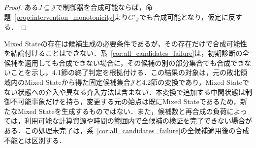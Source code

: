 \begin{proof}
ある$J\subseteq\mathcal{J}$で制御器を合成可能ならば，命題~\ref{prop:intervention_monotonicity}より$G'_{\mathcal{J}}$でも合成可能となり，仮定に反する．

\end{proof}

Mixed Stateの存在は候補生成の必要条件であるが，その存在だけで合成可能性を結論付けることはできない．系~\ref{cor:all_candidates_failure}は，初期診断の全候補を適用しても合成できない場合に，その候補の別の部分集合でも合成できないことを示し，4.1節の終了判定を根拠付ける．この結果の対象は，元の敗北領域内のMixed Stateから得た固定候補集合$\mathcal{J}$と4.2節の変換であり，Mixed Stateでない状態への介入や異なる介入方法は含まない．本変換で追加する中間状態は制御不可能事象だけを持ち，変更する元の始点は既にMixed Stateであるため，新たなMixed Stateを生成するものではない．また，候補数と再合成の負荷によっては，利用可能な計算資源や時間の範囲内で全候補の検証を完了できない場合がある．この処理未完了は，系~\ref{cor:all_candidates_failure}の全候補適用後の合成不能とは区別する．

